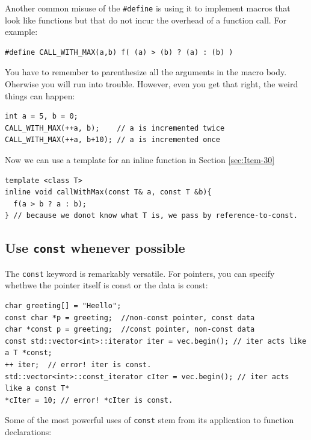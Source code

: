 \documentclass[a4paper,twoside]{article}
\theoremstyle{definition}
\theoremstyle{remark}
\numberwithin{equation}{section}
\let\OldTexttt\texttt
\renewcommand{\texttt}[1]{{\color{blue} \OldTexttt{#1}}}
\begin{document}
Another common misuse of the \texttt{\#define} is using it to
implement macros that look like functions but that do not incur the
overhead of a function call. For example:
\begin{verbatim}
#define CALL_WITH_MAX(a,b) f( (a) > (b) ? (a) : (b) )
\end{verbatim}

You have to remember to parenthesize all the arguments in the macro
body. Oherwise you will run into trouble. However, even you get that
right, the weird things can happen:
\begin{verbatim}
int a = 5, b = 0;
CALL_WITH_MAX(++a, b);    // a is incremented twice
CALL_WITH_MAX(++a, b+10); // a is incremented once
\end{verbatim}

Now we can use a template for an inline function in Section \ref{sec:Item-30}
\begin{verbatim}
template <class T>
inline void callWithMax(const T& a, const T &b){
  f(a > b ? a : b);
} // because we donot know what T is, we pass by reference-to-const.
\end{verbatim}

\subsection{Use \texttt{const} whenever possible}
\label{sec:Item-3}
The \texttt{const} keyword is remarkably versatile. For pointers, you
can specify whethwe the pointer itself is const or the data is const:
\begin{verbatim}
char greeting[] = "Heello";
const char *p = greeting;  //non-const pointer, const data
char *const p = greeting;  //const pointer, non-const data
const std::vector<int>::iterator iter = vec.begin(); // iter acts like a T *const;
++ iter;  // error! iter is const.
std::vector<int>::const_iterator cIter = vec.begin(); // iter acts like a const T*
*cIter = 10; // error! *cIter is const.
\end{verbatim}

Some of the most powerful uses of \texttt{const} stem from its
application to function declarations:
\end{document}
